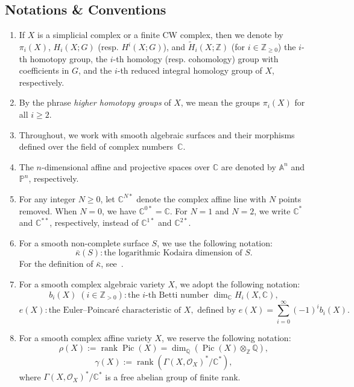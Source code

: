 \documentclass[12pt,reqno,twoside]{amsart}
\theoremstyle{definition}
\numberwithin{equation}{section}
\newcommand{\A}{\mathbb{A}}
\newcommand{\C}{\mathbb{C}}
\newcommand{\Q}{\mathbb{Q}}
\newcommand{\Z}{\mathbb{Z}}
\newcommand{\Kbar}{\bar{\kappa}}
\newcommand{\PP}{\mathbb{P}}
\newcommand{\wt}{\widetilde}
\newcommand{\Pic}{\operatorname{Pic}}
\newcommand{\rank}{\operatorname{rank}}
\begin{document}
\subsection{Notations \& Conventions}
\begin{enumerate}[\indent$\bullet$]

\item If $X$ is a simplicial complex or a finite CW complex, then we denote by 
$\pi_i(X)$, $H_i(X; G)$ (resp. $H^i(X; G)$), and $\wt{H}_i(X; \Z)$ (for $i \in \Z_{\ge 0}$) 
the $i$-th homotopy group, the $i$-th homology (resp. cohomology) group with coefficients in $G$, 
and the $i$-th reduced integral homology group of $X$, respectively.

\item By the phrase \emph{higher homotopy groups} of $X$, we mean the groups $\pi_i(X)$ for all $i \ge 2$.

\item[$\bullet$] Throughout, we work with smooth algebraic surfaces and their morphisms defined over the field of complex numbers~$\C$.

\item The $n$-dimensional affine and projective spaces over $\C$ are denoted by $\A^n$ and $\PP^n$, respectively.

\item For any integer $N \ge 0$, let $\C^{N*}$ denote the complex affine line with $N$ points removed. 
When $N = 0$, we have $\C^{0*} = \C$. 
For $N = 1$ and $N = 2$, we write $\C^*$ and $\C^{**}$, respectively, instead of $\C^{1*}$ and $\C^{2*}$.

\item For a smooth non-complete surface $S$, we use the following notation:
\[
\Kbar(S) : \text{the logarithmic Kodaira dimension of } S.
\]
For the definition of $\Kbar$, see~\cite{Iit1982}.

\item For a smooth complex algebraic variety $X$, we adopt the following notation:
\[
b_i(X) \; (i \in \Z_{>0}) : \text{the $i$-th Betti number } \dim_{\C} H_i(X, \C),
\]
\[
e(X) : \text{the Euler--Poincaré characteristic of } X, \text{ defined by } 
e(X) = \sum_{i = 0}^{\infty} (-1)^i b_i(X).
\]

\item For a smooth complex affine variety $X$, we reserve the following notation:
\[
\rho(X) := \rank \Pic(X) = \dim_\Q \left(\Pic(X) \otimes_\Z \Q\right),
\]
\[
\gamma(X) := \rank \left( \Gamma(X, \mathcal{O}_X)^\ast / \C^\ast \right),
\]
where $\Gamma(X, \mathcal{O}_X)^\ast / \C^\ast$ is a free abelian group of finite rank.
\end{enumerate}
\end{document}
